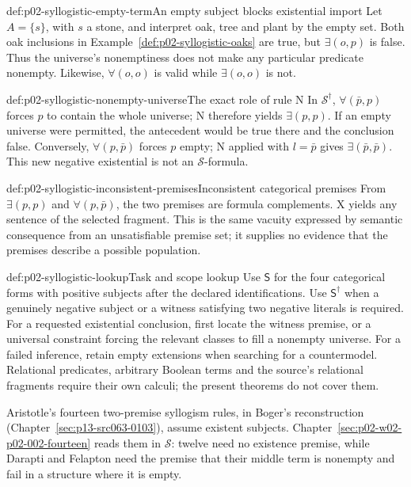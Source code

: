 \begin{hbexample}{def:p02-syllogistic-empty-term}{An empty subject blocks existential import}
Let \(A=\{s\}\), with \(s\) a stone, and interpret oak, tree and plant by
the empty set. Both oak inclusions in
Example~\ref{def:p02-syllogistic-oaks} are true, but
\(\exists(o,p)\) is false. Thus the universe's nonemptiness does not make
any particular predicate nonempty. Likewise, \(\forall(o,o)\) is valid while
\(\exists(o,o)\) is not.
\end{hbexample}

\begin{hbexample}{def:p02-syllogistic-nonempty-universe}{The exact role of rule N}
In \(\mathcal S^\dagger\), \(\forall(\bar p,p)\) forces \(p\) to contain
the whole universe; N therefore yields \(\exists(p,p)\). If an empty universe
were permitted, the antecedent would be true there and the conclusion false.
Conversely, \(\forall(p,\bar p)\) forces \(p\) empty; N applied with
\(l=\bar p\) gives \(\exists(\bar p,\bar p)\). This new negative existential
is not an \(\mathcal S\)-formula.
\end{hbexample}

\begin{hbexample}{def:p02-syllogistic-inconsistent-premises}{Inconsistent categorical premises}
From \(\exists(p,p)\) and \(\forall(p,\bar p)\), the two premises are
formula complements. X yields any sentence of the selected fragment. This
is the same vacuity expressed by semantic consequence from an unsatisfiable
premise set; it supplies no evidence that the premises describe a possible
population.
\end{hbexample}

\begin{hbconvention}{def:p02-syllogistic-lookup}{Task and scope lookup}
Use \(\mathsf S\) for the four categorical forms with positive subjects after
the declared identifications. Use \(\mathsf S^\dagger\) when a genuinely
negative subject or a witness satisfying two negative literals is required.
For a requested existential conclusion, first locate the witness premise,
or a universal constraint forcing the relevant classes to fill a nonempty
universe. For a failed inference, retain empty extensions when searching for
a countermodel. Relational predicates, arbitrary Boolean terms and the
source's relational fragments require their own calculi; the present theorems
do not cover them.
\end{hbconvention}

Aristotle's fourteen two-premise syllogism rules, in Boger's reconstruction
(Chapter~\ref{sec:p13-src063-0103}), assume existent subjects.
Chapter~\ref{sec:p02-w02-p02-002-fourteen} reads them in \(\mathcal S\):
twelve need no existence premise, while Darapti and Felapton need the
premise that their middle term is nonempty and fail in a structure where it
is empty.

